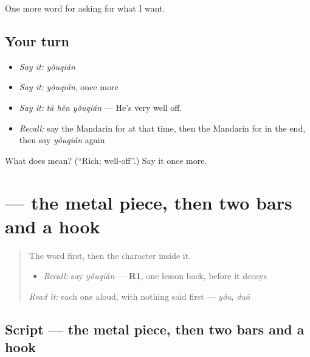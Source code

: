 \begin{grammarlens}[title={What you've built}]
One more word for asking for what I want.
\end{grammarlens}

\subsection*{Your turn}
\begin{itemize}
\raggedright
  \item \emph{Say it:} \emph{yǒuqián}
  \item \emph{Say it:} \emph{yǒuqián}, once more
  \item \emph{Say it:} \emph{tā hěn yǒuqián} — He's very well off.
  \item \emph{Recall:} say the Mandarin for at that time, then the Mandarin for in the end, then say \emph{yǒuqián} again
\end{itemize}

\begin{tcolorbox}[breakable,colback=teal!4,colframe=teal!35!black,title={Before you move on}]
What does  mean? (\textquotedblleft{}Rich; well-off\textquotedblright{}.) Say it once more.
\end{tcolorbox}
\section[\texorpdfstring{\zh{钱} (qián)}{钱 (qián)}]{ — the metal piece, then two bars and a hook}

\label{lesson:ZH-W188-qian-money}



\begin{quote}
The word first, then the character inside it.

\begin{itemize}
\raggedright
  \item \emph{Recall:} say \emph{yǒuqián} — \textbf{R1}, one lesson back, before it decays
\end{itemize}

\begin{quote}
 
\end{quote}

\emph{Read it:} each one aloud, with nothing said first — \emph{yǒu}, \emph{duō}
\end{quote}

\subsection*{Script — the metal piece, then two bars and a hook}

